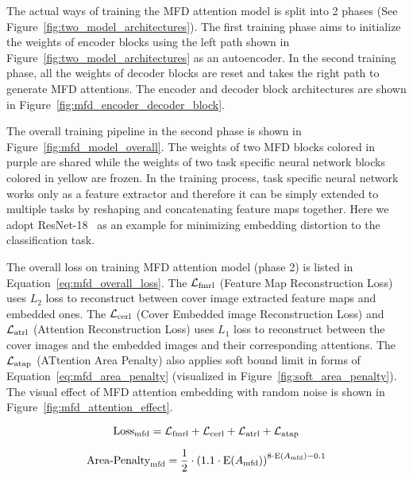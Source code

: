 \figureTwoModelArchitectures%

\figureMFDModelOverall%
 
\figureMfdEncoderDecoderBlock%

The actual ways of training the MFD attention model is split into 2 phases (See Figure~\ref{fig:two_model_architectures}). The first training phase aims to initialize the weights of encoder blocks using the left path shown in Figure~\ref{fig:two_model_architectures} as an autoencoder. In the second training phase, all the weights of decoder blocks are reset and takes the right path to generate MFD attentions. The encoder and decoder block architectures are shown in Figure~\ref{fig:mfd_encoder_decoder_block}.

The overall training pipeline in the second phase is shown in Figure~\ref{fig:mfd_model_overall}. The weights of two MFD blocks colored in purple are shared while the weights of two task specific neural network blocks colored in yellow are frozen. In the training process, task specific neural network works only as a feature extractor and therefore it can be simply extended to multiple tasks by reshaping and concatenating feature maps together. Here we adopt ResNet-18~\cite{ResNet} as an example for minimizing embedding distortion to the classification task.

The overall loss on training MFD attention model (phase 2) is listed in Equation~\ref{eq:mfd_overall_loss}.
The \( \mathcal{L}_\mathrm{fmrl} \) (Feature Map Reconstruction Loss) uses \(L_2\) loss to reconstruct between cover image extracted feature maps and embedded ones. The \( \mathcal{L}_\mathrm{cerl} \) (Cover Embedded image Reconstruction Loss) and \( \mathcal{L}_\mathrm{atrl} \) (Attention Reconstruction Loss) uses \(L_1\) loss to reconstruct between the cover images and the embedded images and their corresponding attentions. The \( \mathcal{L}_\mathrm{atap} \) (ATtention Area Penalty) also applies soft bound limit in forms of Equation~\ref{eq:mfd_area_penalty} (visualized in Figure~\ref{fig:soft_area_penalty}). The visual effect of MFD attention embedding with random noise is shown in Figure~\ref{fig:mfd_attention_effect}.

\begin{equation}
  \mathrm{Loss}_{\text{mfd}} = \mathcal{L}_\mathrm{fmrl} + \mathcal{L}_\mathrm{cerl} + \mathcal{L}_\mathrm{atrl} + \mathcal{L}_\mathrm{atap}
  \label{eq:mfd_overall_loss}
\end{equation}

\begin{equation}
  \text{Area-Penalty}_{\text{mfd}} = \frac{1}{2} \cdot {(1.1 \cdot \mathrm{E}(A_{\text{mfd}}))}^{8 \cdot \mathrm{E}(A_{\text{mfd}}) - 0.1}
  \label{eq:mfd_area_penalty}
\end{equation}

\figureSoftAreaPenalty%

\figureMfdAttentionEffect%
